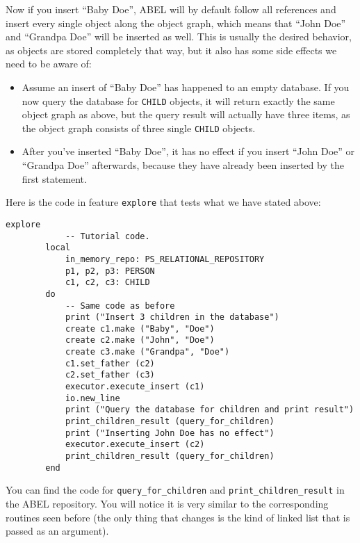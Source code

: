 \documentclass[a4paper,12pt]{report}
\begin{document}
	\begin{center}
	\end{center}

Now if you insert ``Baby Doe'', ABEL will by default follow all references and insert every single object along the object graph, which means that ``John Doe'' and ``Grandpa Doe'' will be inserted as well.
This is usually the desired behavior, as objects are stored completely that way, but it also has some side effects we need to be aware of:

\begin{itemize}
\item Assume an insert of ``Baby Doe'' has happened to an empty database. 
If you now query the database for \lstinline!CHILD! objects, it will return exactly the same object graph as above, but the query result will actually have three items, as the object graph consists of three single \lstinline!CHILD! objects.
	
\item After you've inserted ``Baby Doe'', it has no effect if you insert ``John Doe'' or ``Grandpa Doe'' afterwards, because they have already been inserted by the first statement.
\end{itemize}

Here is the code in feature \lstinline{explore} that tests what we have stated above:
\begin{lstlisting}[language=OOSC2Eiffel, captionpos=b, caption={Inserting objects having references to other objects.}, label={lst:references_handling}]
	explore
			-- Tutorial code.
		local
			in_memory_repo: PS_RELATIONAL_REPOSITORY
			p1, p2, p3: PERSON
			c1, c2, c3: CHILD
		do
			-- Same code as before
			print ("Insert 3 children in the database")
			create c1.make ("Baby", "Doe")
			create c2.make ("John", "Doe")
			create c3.make ("Grandpa", "Doe")
			c1.set_father (c2)
			c2.set_father (c3)
			executor.execute_insert (c1)
			io.new_line
			print ("Query the database for children and print result")
			print_children_result (query_for_children)
			print ("Inserting John Doe has no effect")
			executor.execute_insert (c2)
			print_children_result (query_for_children)
		end
\end{lstlisting}
You can find the code for \lstinline{query_for_children} and \lstinline{print_children_result} in the ABEL repository. You will notice it is very similar to the corresponding routines seen before (the only thing that changes is the kind of linked list that is passed as an argument).
\end{document}
